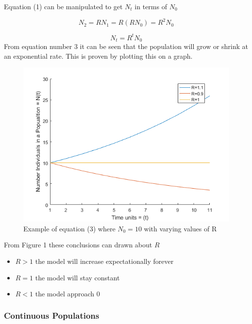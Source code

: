 \documentclass[final]{cmpreport}
\begin{document}
	Equation (1) can be manipulated to get $N_t$ in terms of $N_0$

	\begin{equation}
		N_{2}=RN_1=R(RN_0)=R^2N_0 
	\end{equation}
	
	\begin{equation}
		N_t=R^tN_0 
	\end{equation}
	From equation number 3 it can be seen that the population will grow or shrink at an exponential rate. This is proven by plotting this on a graph.
	
	\begin{figure}[h!]
	\includegraphics[width=\textwidth]{SingleDiscetePopulationsGraph.png}
		\caption{Example of equation (3) where $N_0 = 10$ with varying values of R}  
	\end{figure}
	
	
	
	From Figure 1 these conclusions can drawn about $R$ 
	\begin{itemize}
		\item $R > 1$ the model will increase expectationally forever
		\item $R = 1$ the model will stay constant
		\item $R < 1$ the model approach 0
	\end{itemize}
	
	\subsubsection{Continuous Populations}
	
\end{document}
